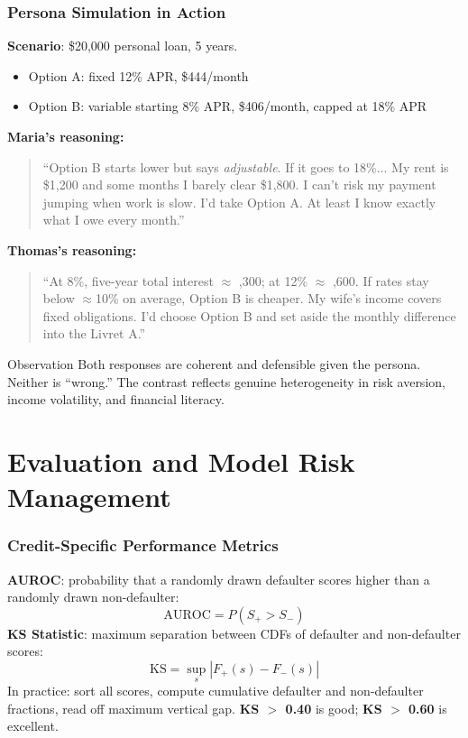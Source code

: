 \documentclass[9pt,t]{beamer}
\begin{document}
\begin{frame}
\frametitle{Persona Simulation in Action}

\textbf{Scenario}: \$20,000 personal loan, 5 years.
\begin{itemize}
  \item Option A: fixed 12\% APR, \$444/month
  \item Option B: variable starting 8\% APR, \$406/month, capped at 18\% APR
\end{itemize}

\medskip
\textbf{Maria's reasoning:}
\begin{quote}
\small
``Option B starts lower but says \emph{adjustable}. If it goes to 18\%... My rent is \$1,200
and some months I barely clear \$1,800. I can't risk my payment jumping when work is slow.
I'd take Option A. At least I know exactly what I owe every month.''
\end{quote}

\textbf{Thomas's reasoning:}
\begin{quote}
\small
``At 8\%, five-year total interest $\approx$ ,300; at 12\% $\approx$ ,600.
If rates stay below $\approx$10\% on average, Option B is cheaper. My wife's income covers
fixed obligations. I'd choose Option B and set aside the monthly difference into the Livret A.''
\end{quote}

\medskip
\begin{block}{Observation}
  Both responses are coherent and defensible given the persona. Neither is ``wrong.''
  The contrast reflects genuine heterogeneity in risk aversion, income volatility, and financial literacy.
\end{block}
\end{frame}

\section{Evaluation and Model Risk Management}

\begin{frame}
\frametitle{Credit-Specific Performance Metrics}

\begin{underhood}
\textbf{AUROC}: probability that a randomly drawn defaulter scores higher than a randomly drawn non-defaulter:
\[
  \text{AUROC} = P(S_+ > S_-)
\]
\textbf{KS Statistic}: maximum separation between CDFs of defaulter and non-defaulter scores:
\[
  \text{KS} = \sup_{s} |F_+(s) - F_-(s)|
\]
In practice: sort all scores, compute cumulative defaulter and non-defaulter fractions,
read off maximum vertical gap. \textbf{KS $>$ 0.40} is good; \textbf{KS $>$ 0.60} is excellent.
\end{underhood}
\end{frame}
\end{document}
